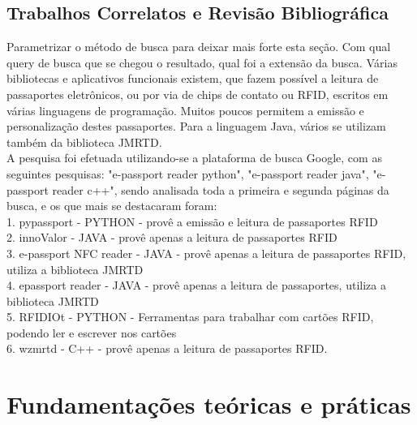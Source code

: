\documentclass{article}
\begin{document}
	\subsection{Trabalhos Correlatos e Revisão Bibliográfica}
		\begin{justify}
		Parametrizar o método de busca para deixar mais forte esta seção. Com qual query de busca que se chegou o resultado, qual foi a extensão da busca.
			\hspace{2cm} Várias bibliotecas e aplicativos funcionais existem, que fazem possível a leitura de passaportes eletrônicos, ou por via de chips de contato ou RFID, escritos em várias linguagens de programação. Muitos poucos permitem a emissão e personalização destes passaportes. Para a linguagem Java, vários se utilizam também da biblioteca JMRTD. \\
			\hspace*{2cm}A pesquisa foi efetuada utilizando-se a plataforma de busca Google, com as seguintes pesquisas: "e-passport reader python", "e-passport reader java", "e-passport reader c++", sendo analisada toda a primeira e segunda páginas da busca, e os que mais se destacaram foram:\\
			\hspace*{2cm}1. pypassport\cite{PYPASSPORT} - PYTHON - provê a emissão e leitura de passaportes RFID \\
			\hspace*{2cm}2. innoValor\cite{INNOVALOR} - JAVA - provê apenas a leitura de passaportes RFID\\
			\hspace*{2cm}3. e-passport NFC reader\cite{TANANAEV} - JAVA - provê apenas a leitura de passaportes RFID, utiliza a biblioteca JMRTD\\
			\hspace*{2cm}4. epassport reader\cite{GLAMDRING} - JAVA - provê apenas a leitura de passaportes, utiliza a biblioteca JMRTD \\
			\hspace*{2cm}5. RFIDIOt\cite{RFIDIOT} - PYTHON - Ferramentas para trabalhar com cartões RFID, podendo ler e escrever nos cartões\\
			\hspace*{2cm}6. wzmrtd\cite{WZMRTD} - C++ - provê apenas a leitura de passaportes RFID.


		\end{justify}

	\section {Fundamentações teóricas e práticas}
\end{document}
